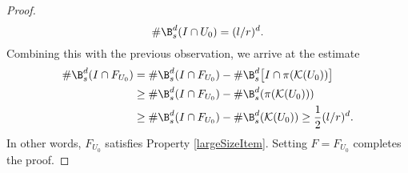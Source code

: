 \begin{proof}
\[ \# \B_{s}^d(I \cap U_0) = (l/r)^d. \] 	
Combining this with the previous observation, we arrive at the estimate 
\begin{align*}  \# \B_{s}^d(I \cap F_{U_0}) &= \# \B_{s}^d(I \cap F_{U_0}) - \# \B_{s}^d \bigl[ I \cap \pi(\mathcal K(U_0)) \bigr] \\  
&\geq \# \B_{s}^d(I \cap F_{U_0}) - \# \B_{s}^d (\pi(\mathcal K(U_0))) \\ 
& \geq  \# \B_{s}^d(I \cap F_{U_0}) - \# \B_{s}^d (\mathcal K(U_0)) \geq \frac{1}{2} (l/r)^d.  
\end{align*}  
	In other words, $F_{U_0}$ satisfies Property \ref{largeSizeItem}. Setting $F = F_{U_0}$ completes the proof.
\end{proof}

